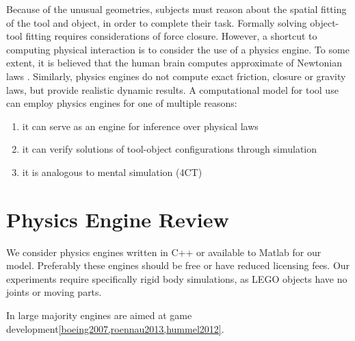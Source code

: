 \documentclass[11]{article}
\begin{document}
Because of the unusual geometries, subjects must reason about the spatial fitting of the tool and object, in order to complete their task.    
Formally solving object-tool fitting requires considerations of force closure.
However, a shortcut to computing physical interaction is to consider the use of a physics engine. 
To some extent, it is believed that the human brain computes approximate of Newtonian laws \cite{battaglia2013}. 
Similarly, physics engines do not compute exact friction, closure or gravity laws, but provide realistic dynamic results. 
A computational model for tool use can employ physics engines for one of multiple reasons:
\begin{enumerate}
      \item it can serve as an engine for inference over physical laws   
      \item it can verify solutions of tool-object configurations through simulation
      \item it is analogous to mental simulation (4CT)
\end{enumerate}

\section{Physics Engine Review}
We consider physics engines written in C++ or available to Matlab for our model. 
Preferably these engines should be free or have reduced licensing fees. 
Our experiments require specifically rigid body simulations, as LEGO objects have no joints or moving parts.

In large majority engines are aimed at game development\ref{boeing2007,roennau2013,hummel2012}. 


\printbibliography
\end{document}
